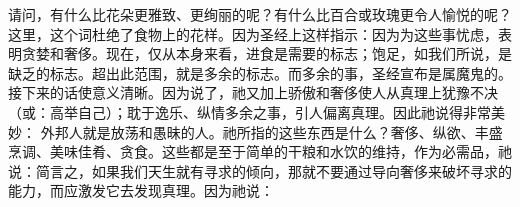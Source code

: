 请问，有什么比花朵更雅致、更绚丽的呢？有什么比百合或玫瑰更令人愉悦的呢？ 这里，这个词杜绝了食物上的花样。因为圣经上这样指示：因为为这些事忧虑，表明贪婪和奢侈。现在，仅从本身来看，进食是需要的标志；饱足，如我们所说，是缺乏的标志。超出此范围，就是多余的标志。而多余的事，圣经宣布是属魔鬼的。接下来的话使意义清晰。因为说了，祂又加上骄傲和奢侈使人从真理上犹豫不决（或：高举自己）；耽于逸乐、纵情多余之事，引人偏离真理。因此祂说得非常美妙： 外邦人就是放荡和愚昧的人。祂所指的这些东西是什么？奢侈、纵欲、丰盛烹调、美味佳肴、贪食。这些都是至于简单的干粮和水饮的维持，作为必需品，祂说：简言之，如果我们天生就有寻求的倾向，那就不要通过导向奢侈来破坏寻求的能力，而应激发它去发现真理。因为祂说：\par

